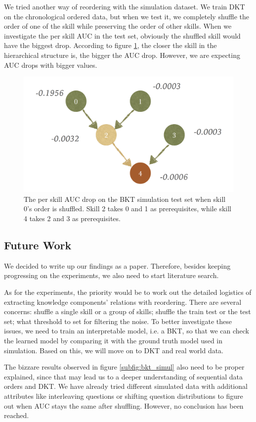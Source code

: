 We tried another way of reordering with the simulation dataset. We train DKT on the chronological ordered data, but when we test it, we completely shuffle the order of one of the skill while preserving the order of other skills. When we investigate the per skill AUC in the test set, obviously the shuffled skill would have the biggest drop. According to figure \ref{fig:drop}, the closer the skill in the hierarchical structure is, the bigger the AUC drop. However, we are expecting AUC drops with bigger values.

\begin{figure}
    \centering
    \includegraphics[width=0.6\linewidth]{figures/simulation_AUC_drop.png}
    \caption{The per skill AUC drop on the BKT simulation test set when skill 0's order is shuffled. Skill 2 takes 0 and 1 as prerequisites, while skill 4 takes 2 and 3 as prerequisites.}
    \label{fig:drop}
\end{figure}

\subsection{Future Work}

We decided to write up our findings as a paper. Therefore, besides keeping progressing on the experiments, we also need to start literature search. 

As for the experiments, the priority would be to work out the detailed logistics of extracting knowledge components' relations with reordering. There are several concerns: shuffle a single skill or a group of skills; shuffle the train test or the test set; what threshold to set for filtering the noise. To better investigate these issues, we need to train an interpretable model, i.e. a BKT, so that we can check the learned model by comparing it with the ground truth model used in simulation. Based on this, we will move on to DKT and real world data.

The bizzare results observed in figure \ref{subfig:bkt_simul} also need to be proper explained, since that may lead us to a deeper understanding of sequential data orders and DKT. We have already tried different simulated data with additional attributes like interleaving questions or shifting question distributions to figure out when AUC stays the same after shuffling. However, no conclusion has been reached.

